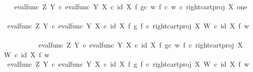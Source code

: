 \begin{isabellebody}
\ \isamarkupfalse%
\ {\isachardoublequoteopen}{\isachardot}{\kern0pt}{\isachardot}{\kern0pt}{\isachardot}{\kern0pt}\ {\isacharequal}{\kern0pt}\ {\isacharparenleft}{\kern0pt}eval{\isacharunderscore}{\kern0pt}func\ Z\ Y\ {\isasymcirc}\isactrlsub c\ {\isasymlangle}eval{\isacharunderscore}{\kern0pt}func\ Y\ X\ {\isasymcirc}\isactrlsub c\ {\isacharparenleft}{\kern0pt}id\ X\ {\isasymtimes}\isactrlsub f\ {\isacharparenleft}{\kern0pt}g{\isasymcirc}\isactrlsub c\ w{\isacharparenright}{\kern0pt}{\isacharparenright}{\kern0pt}{\isacharcomma}{\kern0pt}\ {\isacharparenleft}{\kern0pt}f\ {\isasymcirc}\isactrlsub c\ w{\isacharparenright}{\kern0pt}\ {\isasymcirc}\isactrlsub c\ right{\isacharunderscore}{\kern0pt}cart{\isacharunderscore}{\kern0pt}proj\ X\ one{\isasymrangle}{\isacharparenright}{\kern0pt}\isactrlsup {\isasymsharp}{\isachardoublequoteclose}\isanewline
\ \ \isamarkupfalse%
\ {\isacharminus}{\kern0pt}\ \isanewline
\ \ \ \ \isamarkupfalse%
\ {\isachardoublequoteopen}{\isacharparenleft}{\kern0pt}eval{\isacharunderscore}{\kern0pt}func\ Z\ Y\ {\isasymcirc}\isactrlsub c\ {\isasymlangle}eval{\isacharunderscore}{\kern0pt}func\ Y\ X\ {\isasymcirc}\isactrlsub c\ {\isacharparenleft}{\kern0pt}id\ X\ {\isasymtimes}\isactrlsub f\ g{\isacharparenright}{\kern0pt}{\isacharcomma}{\kern0pt}\ f\ {\isasymcirc}\isactrlsub c\ right{\isacharunderscore}{\kern0pt}cart{\isacharunderscore}{\kern0pt}proj\ X\ W{\isasymrangle}{\isacharparenright}{\kern0pt}\isactrlsup {\isasymsharp}\isactrlsup {\isasymflat}\ {\isasymcirc}\isactrlsub c\ {\isacharparenleft}{\kern0pt}id\ X\ {\isasymtimes}\isactrlsub f\ w{\isacharparenright}{\kern0pt}\ {\isacharequal}{\kern0pt}\ \isanewline
\ \ \ \ \ \ \ \ \ \ eval{\isacharunderscore}{\kern0pt}func\ Z\ Y\ {\isasymcirc}\isactrlsub c\ {\isasymlangle}eval{\isacharunderscore}{\kern0pt}func\ Y\ X\ {\isasymcirc}\isactrlsub c\ {\isacharparenleft}{\kern0pt}id\ X\ {\isasymtimes}\isactrlsub f\ {\isacharparenleft}{\kern0pt}g{\isasymcirc}\isactrlsub c\ w{\isacharparenright}{\kern0pt}{\isacharparenright}{\kern0pt}{\isacharcomma}{\kern0pt}\ f\ {\isasymcirc}\isactrlsub c\ right{\isacharunderscore}{\kern0pt}cart{\isacharunderscore}{\kern0pt}proj\ X\ W\ {\isasymcirc}\isactrlsub c\ {\isacharparenleft}{\kern0pt}id\ X\ {\isasymtimes}\isactrlsub f\ w{\isacharparenright}{\kern0pt}{\isasymrangle}{\isachardoublequoteclose}\isanewline
\ \ \ \ \isamarkupfalse%
\ {\isacharminus}{\kern0pt}\ \isanewline
\ \ \ \ \ \ \isamarkupfalse%
\ {\isachardoublequoteopen}eval{\isacharunderscore}{\kern0pt}func\ Z\ Y\ {\isasymcirc}\isactrlsub c\ {\isasymlangle}eval{\isacharunderscore}{\kern0pt}func\ Y\ X\ {\isasymcirc}\isactrlsub c\ {\isacharparenleft}{\kern0pt}id\ X\ {\isasymtimes}\isactrlsub f\ g{\isacharparenright}{\kern0pt}{\isacharcomma}{\kern0pt}\ f\ {\isasymcirc}\isactrlsub c\ right{\isacharunderscore}{\kern0pt}cart{\isacharunderscore}{\kern0pt}proj\ X\ W{\isasymrangle}\ {\isasymcirc}\isactrlsub c\ {\isacharparenleft}{\kern0pt}id\ X\ {\isasymtimes}\isactrlsub f\ w{\isacharparenright}{\kern0pt}\ \isanewline

\end{isabellebody}
